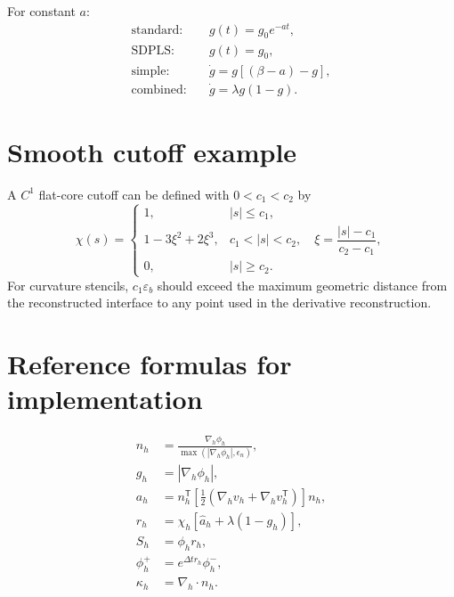 \documentclass[11pt,a4paper]{article}
\theoremstyle{definition}
\theoremstyle{remark}
\newcommand{\abs}[1]{\left\lvert #1\right\rvert}
\begin{document}
For constant $a$:
\begin{align}
  \text{standard:}\quad &g(t)=g_0e^{-at},\\
  \text{SDPLS:}\quad &g(t)=g_0,\\
  \text{simple:}\quad &\dot g=g[(\beta-a)-g],\\
  \text{combined:}\quad &\dot g=\lambda g(1-g).
\end{align}

\section{Smooth cutoff example}

A $C^1$ flat-core cutoff can be defined with $0<c_1<c_2$ by
\begin{equation}
  \chi(s)=
  \begin{cases}
    1, & \abs s\le c_1,\\
    1-3\xi^2+2\xi^3,
      & c_1<\abs s<c_2,\quad \xi=\dfrac{\abs s-c_1}{c_2-c_1},\\
    0, & \abs s\ge c_2.
  \end{cases}
\end{equation}
For curvature stencils, $c_1\varepsilon_b$ should exceed the maximum geometric distance from the reconstructed interface to any point used in the derivative reconstruction.

\section{Reference formulas for implementation}

\begin{align}
  n_h&=\frac{\nabla_h\phi_h}{\max(\abs{\nabla_h\phi_h},\epsilon_n)},\\
  g_h&=\abs{\nabla_h\phi_h},\\
  a_h&=n_h^{\mathsf T}\left[\frac12(\nabla_hv_h+\nabla_hv_h^{\mathsf T})\right]n_h,\\
  r_h&=\chi_h\left[\widehat a_h+\lambda(1-g_h)\right],\\
  S_h&=\phi_h r_h,\\
  \phi_h^{+}&=e^{\Delta t r_h}\phi_h^{-},\\
  \kappa_h&=\nabla_h\cdot n_h.
\end{align}
\end{document}

